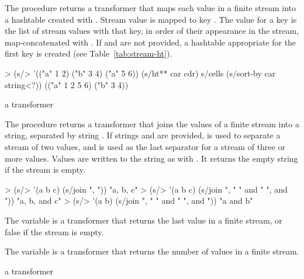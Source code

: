 The  procedure returns a transformer that maps each value in a finite stream
into a hashtable created with . Stream
value  is mapped to key . The value for a key is the list of stream
values with that key, in order of their appearance in the stream, map-concatenated with
. If  and  are not provided, a hashtable appropriate for the
first key is created (see Table~\ref{tab:stream-ht}).

\codebegin
> (s/> '(("a" 1 2) ("b" 3 4) ("a" 5 6))
    (s/ht** car cdr)
    s/cells
    (s/sort-by car string<?))
(("a" 1 2 5 6) ("b" 3 4))
\codeend

\begin{procedure}
\end{procedure}
\returns{} a transformer

The  procedure returns a transformer that joins the values of a finite stream
into a string, separated by string . If strings  and 
are provided,  is used to separate a stream of two values, and 
is used as the last separator for a stream of three or more values.  Values are written to
the string as with . It returns the empty string if the stream is empty.

\codebegin
> (s/> '(a b c) (s/join ", "))
"a, b, c"
> (s/> '(a b c) (s/join ", " " and " ", and "))
"a, b, and c"
> (s/> '(a b) (s/join ", " " and " ", and "))
"a and b"
\codeend

\begin{variable}
\end{variable}
\antipar

The  variable is a transformer that returns the last value in a finite stream,
or false if the stream is empty.

\begin{variable}
\end{variable}
\antipar

The  variable is a transformer that returns the number of values in a
finite stream.

\begin{procedure}
\end{procedure}
\returns{} a transformer

